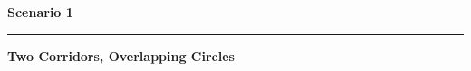 \documentclass{article}
\begin{document}
\centering
\vspace*{\fill}
{\fontsize{44}{52}\selectfont\bfseries Scenario 1\par}
\vspace{8mm}
{\color{accent}\rule{32mm}{0.8mm}\par}
\vspace{10mm}
{\fontsize{40}{48}\selectfont\bfseries Two Corridors, Overlapping Circles\par}
\vspace*{\fill}
\end{document}
